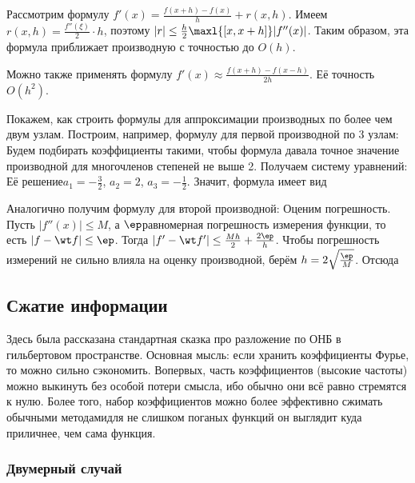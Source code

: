 \documentclass[a4paper]{article}
\begin{document}
Рассмотрим формулу $f'(x) =\frac{f(x+h)-f(x)}{h} + r(x,h)$.
Имеем $r(x,h) = \frac{f''(\xi)}{2} \cdot h$, поэтому $|r| \le \frac h2 \maxl{[x,x+h]} |f''(x)|$.
Таким образом, эта формула приближает производную с точностью до $O(h)$.

Можно также применять формулу $f'(x) \approx \frac{f(x+h)-f(x-h)}{2h}$. Её точность\т $O(h^2)$.

Покажем, как строить формулы для аппроксимации производных по более чем двум узлам. Построим, например, формулу
для первой производной по 3 узлам:
Будем подбирать  коэффициенты такими, чтобы формула давала точное значение производной для многочленов степеней не выше 2.
Получаем систему уравнений:
Её решение\т $a_1 = -\frac32$, $a_2 = 2$, $a_3 = -\frac12$.
Значит, формула имеет вид

Аналогично получим формулу для второй производной:
Оценим погрешность. Пусть $|f''(x)| \le M$, а $\ep$\т равномерная погрешность измерения функции, то есть $|f-\wt f| \le \ep$.
Тогда  $|f'-\wt f'| \le \frac{Mh}{2} + \frac{2\ep}{h}$. Чтобы погрешность измерений не сильно влияла на оценку  производной,
берём $h = 2\sqrt{\frac\ep M}$. Отсюда

\subsection{Сжатие информации}

Здесь была рассказана стандартная сказка про разложение по ОНБ в гильбертовом пространстве.
Основная мысль: если хранить коэффициенты Фурье, то можно сильно сэкономить. Во\д первых, часть коэффициентов (высокие частоты)
можно выкинуть без особой потери смысла, ибо обычно они всё равно стремятся к нулю. Более того, набор коэффициентов можно
более эффективно сжимать обычными методами\т для не слишком поганых функций он выглядит куда приличнее, чем сама функция.

\subsubsection{Двумерный случай}
\end{document}
